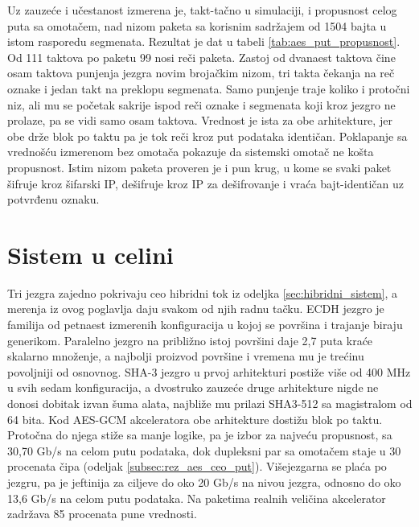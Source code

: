 \smallbreak
Uz zauzeće i učestanost izmerena je, takt-tačno u simulaciji, i propusnost celog puta sa omotačem, nad nizom paketa sa korisnim sadržajem od 1504 bajta u istom rasporedu segmenata. Rezultat je dat u tabeli \ref{tab:aes_put_propusnost}. Od 111 taktova po paketu 99 nosi reči paketa. Zastoj od dvanaest taktova čine osam taktova punjenja jezgra novim brojačkim nizom, tri takta čekanja na reč oznake i jedan takt na preklopu segmenata. Samo punjenje traje koliko i protočni niz, ali mu se početak sakrije ispod reči oznake i segmenata koji kroz jezgro ne prolaze, pa se vidi samo osam taktova. Vrednost je ista za obe arhitekture, jer obe drže blok po taktu pa je tok reči kroz put podataka identičan. Poklapanje sa vrednošću izmerenom bez omotača pokazuje da sistemski omotač ne košta propusnost. Istim nizom paketa proveren je i pun krug, u kome se svaki paket šifruje kroz šifarski IP, dešifruje kroz IP za dešifrovanje i vraća bajt-identičan uz potvrđenu oznaku.

\begin{table}[H]
\caption{Propusnost celog puta podataka u ustaljenom stanju, nad paketima sa korisnim sadržajem od 1504 bajta. Kolona \textit{bez omotača} je isti sadržaj iz tabele \ref{tab:aes_kratki}}
\centering
{\renewcommand{\arraystretch}{1.25}
}
\label{tab:aes_put_propusnost}
\end{table}

\section{Sistem u celini}
\label{sec:rez_sinteza}

Tri jezgra zajedno pokrivaju ceo hibridni tok iz odeljka \ref{sec:hibridni_sistem}, a merenja iz ovog poglavlja daju svakom od njih radnu tačku. ECDH jezgro je familija od petnaest izmerenih konfiguracija u kojoj se površina i trajanje biraju generikom. Paralelno jezgro na približno istoj površini daje 2,7 puta kraće skalarno množenje, a najbolji proizvod površine i vremena mu je trećinu povoljniji od osnovnog. SHA-3 jezgro u prvoj arhitekturi postiže više od 400 MHz u svih sedam konfiguracija, a dvostruko zauzeće druge arhitekture nigde ne donosi dobitak izvan šuma alata, najbliže mu prilazi SHA3-512 sa magistralom od 64 bita. Kod AES-GCM akceleratora obe arhitekture dostižu blok po taktu. Protočna do njega stiže sa manje logike, pa je izbor za najveću propusnost, sa 30,70 Gb/s na celom putu podataka, dok dupleksni par sa omotačem staje u 30 procenata čipa (odeljak \ref{subsec:rez_aes_ceo_put}). Višejezgarna se plaća po jezgru, pa je jeftinija za ciljeve do oko 20 Gb/s na nivou jezgra, odnosno do oko 13,6 Gb/s na celom putu podataka. Na paketima realnih veličina akcelerator zadržava 85 procenata pune vrednosti.

